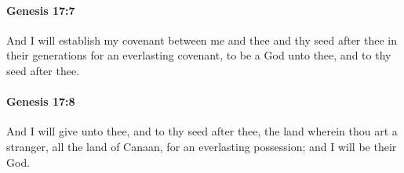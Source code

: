 		\paragraph{Genesis 17:7} %
			\label{GENESIS-17-7}

			And I will establish my covenant between me and thee and thy seed after thee in their generations for an everlasting covenant, to be a God unto thee, and to thy seed after thee.


		\paragraph{Genesis 17:8} %
			\label{GENESIS-17-8}

			And I will give unto thee, and to thy seed after thee, the land wherein thou art a stranger, all the land of Canaan, for an everlasting possession; and I will be their God.


